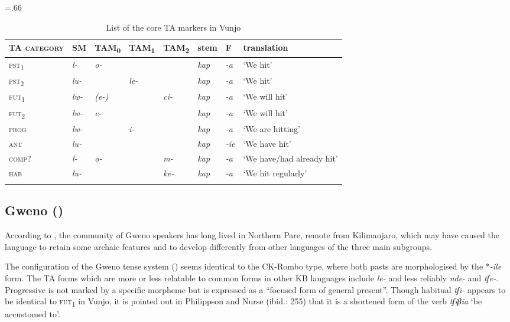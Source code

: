 \documentclass[output=paper]{langscibook}
\begin{document}
\begin{table}
\small\tabcolsep=.66\tabcolsep
\begin{tabularx}{\textwidth}{>{\scshape}lllllllQ}
\lsptoprule
{TA category} & SM & {TAM\textsubscript{0}} & {TAM\textsubscript{1}} & {TAM\textsubscript{2}} & stem & F & translation\\
\midrule
pst\textsubscript{1} & {\itshape l-} & {\itshape o-} &  &  & {\itshape kap} & {\itshape {}-a} & `We hit'\\
pst\textsubscript{2} & {\itshape lu-} &  & {\itshape le-} &  & {\itshape kap} & {\itshape {}-a} & `We hit'\\
fut\textsubscript{1} & {\itshape lw-} & {\itshape (e-)} &  & {\itshape ci-} & {\itshape kap} & {\itshape {}-a} & `We will hit'\\
fut\textsubscript{2} & {\itshape lw-} & {\itshape e-} &  &  & {\textit{kap}} & {\itshape {}-a} & `We will hit'\\
prog                 & {\itshape lw-} &  & {\itshape i-} &  & {\itshape kap} & {\itshape {}-a} & `We are hitting'\\
ant                  & {\itshape lu-} &  &  &  & {\itshape kap} & {\itshape {}-ie} & `We have hit'\\
comp?                & {\itshape l-} & {\itshape o-} &  & {\itshape m-} & {\itshape kap} & {\itshape {}-a} & `We have/had already hit'\\
hab                  & {\itshape lu-} &  &  & {\itshape ke-} & {\itshape kap} & {\itshape {}-a} & `We hit regularly'\\
\lspbottomrule
\end{tabularx}
\caption{List of the core TA markers in Vunjo}
\label{tab:shinagawa:7}
\end{table}

\subsection{Gweno (\citealt{PhilippsonNurse2000})}\label{sec:shinagawa:2.8}

According to \citet{PhilippsonNurse2000}, the community of Gweno speakers has long lived in Northern Pare, remote from Kilimanjaro, which may have caused the language to retain some archaic features and to develop differently from other languages of the three main subgroups.

The configuration of the Gweno tense system () seems identical to the CK-Rombo type, where both pasts are morphologised by the *\textit{{}-ile} form. The TA forms which are more or less relatable to common forms in other KB languages include \textit{le-} and less reliably \textit{nde-} and \textit{tʃe-}. Progressive is not marked by a specific morpheme but is expressed as a “focused form of general present”. Though habitual \textit{tʃi-} appears to be identical to \textsc{fut}\textsubscript{1} in Vunjo, it is pointed out in Philippson and Nurse (ibid.: 255) that it is a shortened form of the verb \textit{tʃiβia} ‘be accustomed to’.
\end{document}
